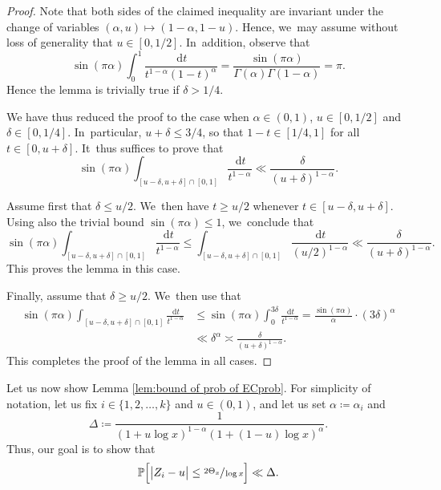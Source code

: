 \documentclass[JEP,XML,SOM,Unicode,published]{cedram}
\newcommand{\PP}{\mathbb{P}}
\newcommand{\dee}{\,\mathrm{d}}
\newcommand{\bg}{\big}
\newcommand{\bgg}{\Big}
\theoremstyle{plain}
\theoremstyle{definition}
\begin{document}
\begin{proof} Note that both sides of the claimed inequality are invariant under the change of variables $(\alpha,u)\mapsto (1-\alpha,1-u)$. Hence, we~may assume without loss of generality that $u\in[0,1/2]$. In~addition, observe that
\[
\sin(\pi\alpha)\int_0^1 \frac{\dee t}{t^{1-\alpha}(1-t)^\alpha} = \frac{\sin(\pi\alpha)}{\Gamma(\alpha)\Gamma(1-\alpha)} = \pi.
\]
Hence the lemma is trivially true if $\delta > 1/4$.

We have thus reduced the proof to the case when $\alpha\in(0,1)$, $u\in[0,1/2]$ and $\delta\in[0,1/4]$. In~particular, $u+\delta\le 3/4$, so that $1-t\in[1/4,1]$ for all $t\in[0,u+\delta]$. It~thus suffices to prove that
\begin{equation}
\label{eq:beta bound - new goal}
\sin(\pi\alpha) \int_{[u-\delta,u+\delta]\cap[0,1]} \frac{\dee t}{t^{1-\alpha}} \ll \frac{\delta}{(u+\delta)^{1-\alpha}}.
\end{equation}

Assume first that $\delta\le u/2$. We~then have $t\ge u/2$ whenever $t\in[u-\delta,u+\delta]$. Using also the trivial bound $\sin(\pi\alpha)\le1$, we~conclude that
\[
\sin(\pi\alpha) \int_{[u-\delta,u+\delta]\cap[0,1]} \frac{\dee t}{t^{1-\alpha}} \le \int_{[u-\delta,u+\delta]\cap[0,1]} \frac{\dee t}{(u/2)^{1-\alpha}} \ll \frac{\delta}{(u+\delta)^{1-\alpha}}.
\]
This proves the lemma in this case.

Finally, assume that $\delta\ge u/2$. We~then use that
\begin{align*}
\sin(\pi\alpha) \int_{[u-\delta,u+\delta]\cap[0,1]} \frac{\dee t}{t^{1-\alpha}}
&\le \sin(\pi\alpha)\int_0^{3\delta} \frac{\dee t}{t^{1-\alpha}} =\frac{\sin(\pi \alpha)}{\alpha} \cdot (3\delta)^\alpha \\
&\ll \delta^\alpha \asymp \frac{\delta}{(u+\delta)^{1-\alpha}}.
\end{align*}
This completes the proof of the lemma in all cases.
\end{proof}

Let us now show Lemma \ref{lem:bound of prob of ECprob}. For simplicity of notation, let us fix $i\in\{1,2,\dots,k\}$ and $u\in(0,1)$, and let us set $\alpha \coloneqq \alpha_i$ and
\[
\Delta \coloneqq \frac{1}{(1+ u\log x)^{1-\alpha}(1+(1-u)\log x)^{\alpha}}.
\]
Thus, our goal is to show that
\begin{equation}
\label{eq:Bprob rewrite}
\PP\bgg[ \bg| Z_i - u \bg|\le \sfrac{2\Theta_x}{\log x}\bgg] \ll \Delta.
\end{equation}
\end{document}
